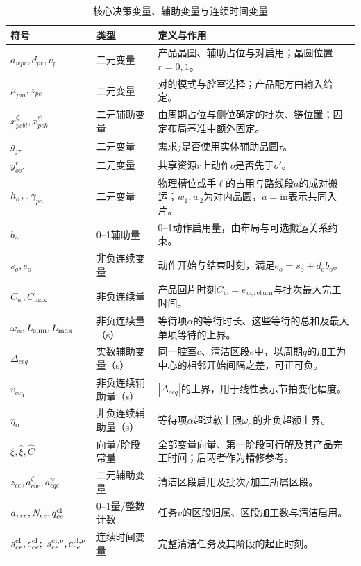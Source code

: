 \documentclass[final,5p,times,twocolumn]{elsarticle}
\begin{document}
\begin{table}[t]
\centering
\scriptsize
\setlength{\tabcolsep}{3pt}
\caption{核心决策变量、辅助变量与连续时间变量}
\label{tab:symbol-cn-b}
\begin{tabular}{C{0.20\textwidth}C{0.16\textwidth}C{0.43\textwidth}}
\toprule
符号 & 类型 & 定义与作用 \\
\midrule
$a_{wpr},d_{pr},v_p$ & 二元变量 & 产品晶圆、辅助占位与对启用；晶圆位置$r=0,1$。\\
$\mu_{pm},z_{pc}$ & 二元变量 & 对的模式与腔室选择；产品配方由输入给定。\\
$x^{\zeta}_{pcbl},x^{\psi}_{pck}$ & 二元辅助变量 & 由周期占位与侧位确定的批次、链位置；固定布局基准中额外固定。\\
$g_{j\tau}$ & 二元变量 & 需求$j$是否使用实体辅助晶圆$\tau$。\\
$y^r_{oo'}$ & 二元变量 & 共享资源$r$上动作$o$是否先于$o'$。\\
$h_{o\ell},\gamma_{pa}$ & 二元变量 & 物理槽位或手$\ell$的占用与路线段$a$的成对搬运；$w_1,w_2$为对内晶圆，$a=\mathrm{in}$表示共同入片。\\
$b_o$ & 0--1辅助量 & 0--1动作启用量，由布局与可选搬运关系约束。\\
$s_o,e_o$ & 非负连续变量 & 动作开始与结束时刻，满足$e_o=s_o+d_ob_o$。\\
$C_w,C_{\max}$ & 非负连续量 & 产品回片时刻$C_w=e_{w,\mathrm{return}}$与批次最大完工时间。\\
$\omega_\alpha,L_{\rm sum},L_{\max}$ & 非负连续量（s） & 等待项$\alpha$的等待时长、这些等待的总和及最大单项等待的上界。\\
$\Delta_{ceq}$ & 实数辅助变量（s） & 同一腔室$c$、清洁区段$e$中，以周期$q$的加工为中心的相邻开始间隔之差，可正可负。\\
$v_{ceq}$ & 非负连续辅助量（s） & $|\Delta_{ceq}|$的上界，用于线性表示节拍变化幅度。\\
$\eta_\alpha$ & 非负连续辅助量（s） & 等待项$\alpha$超过软上限$\bar\omega_\alpha$的非负超额上界。\\
$\xi,\widehat\xi,\widehat C$ & 向量/阶段常量 & 全部变量向量、第一阶段可行解及其产品完工时间；后两者作为精修参考。\\
$z_{ce},a^{\zeta}_{cbe},a^{\psi}_{cqe}$ & 二元辅助变量 & 清洁区段启用及批次/加工所属区段。\\
$a_{vce},N_{ce},q^{\rm cl}_{ce}$ & 0--1量/整数计数 & 任务$v$的区段归属、区段加工数与清洁启用。\\
$s^{\rm cl}_{ce},e^{\rm cl}_{ce};\ s^{\rm cl,\nu}_{ce},e^{\rm cl,\nu}_{ce}$ & 连续时间变量 & 完整清洁任务及其阶段的起止时刻。\\

\end{tabular}
\end{table}
\end{document}
